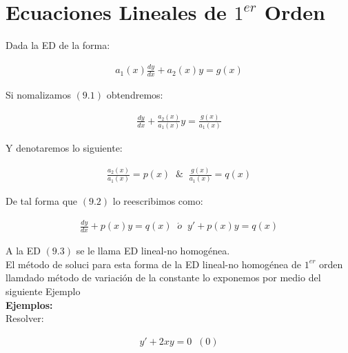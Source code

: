 \chapter{Ecuaciones Lineales de \(\displaystyle1^{er}\) Orden}

Dada la ED de la forma:

\begin{equation}
    \begin{gathered}
        a_{1}\left(x\right)\frac{dy}{dx}+a_{2}\left(x\right)y=g\left(x\right)
    \end{gathered}
\end{equation}

Si nomalizamos \(\displaystyle(9.1)\) obtendremos:

\begin{equation}
    \begin{gathered}
        \frac{dy}{dx}+\frac{a_{2}\left(x\right)}{a_{1}\left(x\right)}y=\frac{g\left(x\right)}{a_{1}\left(x\right)}
    \end{gathered}
\end{equation}

Y denotaremos lo siguiente:

\begin{equation*}
    \begin{gathered}
        \frac{a_{2}(x)}{a_{1}(x)}=p(x)\;\;\&\;\;\frac{g(x)}{a_{1}(x)}=q(x)
    \end{gathered}
\end{equation*}

De tal forma que \(\displaystyle (9.2)\) lo reescribimos como:

\begin{equation}
    \begin{gathered}
        \frac{dy}{dx}+p(x)y=q(x)\;\;\acute{o}\;\;y'+p(x)y=q(x)
    \end{gathered}
\end{equation}

A la ED \(\displaystyle (9.3)\) se le llama ED lineal-no homogénea.\\

El método de soluci para esta forma de la ED lineal-no homogénea de \(\displaystyle 1^{er}\) orden llamdado método de variación de la constante lo exponemos por medio del siguiente Ejemplo\\

\textbf{Ejemplos:}\\

Resolver:

\begin{equation}
    \begin{gathered}
        y'+2xy=0\;\;(0)
    \end{gathered}
\end{equation}

